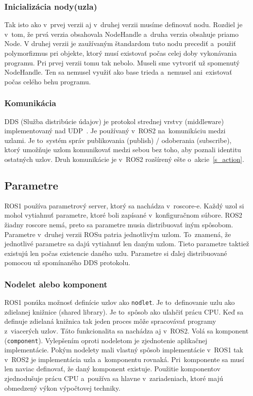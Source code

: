 \subsubsection{Inicializácia nody(uzla)}

	Tak isto ako v~prvej verzii aj v~druhej verzii musíme definovať nodu. Rozdiel je v~tom, že prvá verzia obsahovala NodeHandle a~druha verzia obsahuje priamo Node.
	V druhej verzii je zaužívaným štandardom tuto nodu precediť a~použiť polymorfizmus pri objekte, ktorý musí existovať počas celej doby vykonávania programu. Pri
	prvej verzii tomu tak nebolo. Museli sme vytvoriť už spomenutý NodeHandle. Ten sa nemusel využiť ako base trieda a~nemusel ani~existovať počas celého behu programu.

\newpage
\subsubsection{Komunikácia}

	DDS (Služba distribúcie údajov) je protokol strednej vrstvy (middleware) implementovaný nad UDP~\cite{ROS2book}. Je používaný v~ROS2 na~komunikáciu
	medzi uzlami. Je to~systém správ publikovania (publish) / odoberania (subscribe), ktorý umožňuje uzlom komunikovať medzi sebou bez toho,
	aby poznali identitu ostatných uzlov. Druh komunikácie je v~ROS2 rozšírený ešte o~akcie~\ref{s_action}.

\subsection{Parametre}

	ROS1 používa parametrový server, ktorý sa nachádza v~roscore-e. Každý uzol si mohol vytiahnuť parametre, ktoré boli zapísané v~konfiguračnom súbore.
	ROS2 žiadny roscore nemá, preto sa parametre musia distribuovať iným spôsobom. Parametre v~druhej verzii ROSu patria jednotlivým uzlom. To~znamená, že jednotlivé
	parametre sa dajú vytiahnuť len daným uzlom. Tieto parametre taktiež existujú len počas existencie daného uzlu. Parametre si ďalej distribuované pomocou už spomínaného
	DDS protokolu.

\subsubsection{Nodelet alebo komponent}

	ROS1 ponúka možnosť definície uzlov ako \texttt{nodlet}. Je to~definovanie uzlu ako zdielanej knižnice (shared library). Je to~spôsob ako uľahčiť
	prácu CPU. Keď sa definuje zdielaná knižnica tak jeden proces môže spracovávať programy z~viacerých uzlov. Táto funkcionalita sa nachádza aj v~ROS2.
	Volá sa komponent (\texttt{component}). Vylepšením oproti nodeletom je zjednotenie aplikačnej implementácie. Pokým nodelety mali vlastný spôsob
	implementácie v~ROS1 tak v~ROS2 je implementácia uzla a~komponentu rovnaká. Pri~komponente sa musí len naviac definovať, že daný komponent existuje.
	Použitie komponentov zjednodušuje prácu CPU a~používa sa hlavne v~zariadeniach, ktoré majú obmedzený výkon výpočtovej techniky.

